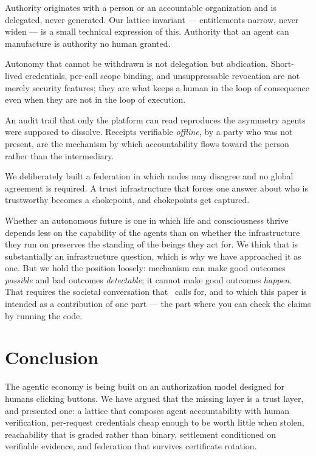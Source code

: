 \documentclass[11pt]{article}
\begin{document}
\begin{description}[leftmargin=1.4em,itemsep=0.2em]
\item[Principals remain human.] Authority originates with a person or an
      accountable organization and is delegated, never generated. Our lattice
      invariant --- entitlements narrow, never widen --- is a small technical
      expression of this. Authority that an agent can manufacture is authority
      no human granted.
\item[Delegation is revocable and bounded.] Autonomy that cannot be withdrawn is
      not delegation but abdication. Short-lived credentials, per-call scope
      binding, and unsuppressable revocation are not merely security features;
      they are what keeps a human in the loop of consequence even when they are
      not in the loop of execution.
\item[Evidence belongs to the principal.] An audit trail that only the platform
      can read reproduces the asymmetry agents were supposed to dissolve.
      Receipts verifiable \emph{offline}, by a party who was not present, are the
      mechanism by which accountability flows toward the person rather than the
      intermediary.
\item[Pluralism over consensus.] We deliberately built a federation in which
      nodes may disagree and no global agreement is required. A trust
      infrastructure that forces one answer about who is trustworthy becomes a
      chokepoint, and chokepoints get captured.
\end{description}

Whether an autonomous future is one in which life and consciousness thrive
depends less on the capability of the agents than on whether the infrastructure
they run on preserves the standing of the beings they act for. We think that is
substantially an infrastructure question, which is why we have approached it as
one. But we hold the position loosely: mechanism can make good outcomes
\emph{possible} and bad outcomes \emph{detectable}; it cannot make good outcomes
\emph{happen}. That requires the societal conversation
that~\cite{pattison2026} calls for, and to which this paper is intended as a
contribution of one part --- the part where you can check the claims by running
the code.

\section{Conclusion}

The agentic economy is being built on an authorization model designed for humans
clicking buttons. We have argued that the missing layer is a trust layer, and
presented one: a lattice that composes agent accountability with human
verification, per-request credentials cheap enough to be worth little when
stolen, reachability that is graded rather than binary, settlement conditioned on
verifiable evidence, and federation that survives certificate rotation.
\end{document}

